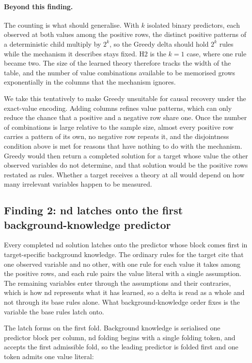 \documentclass[11pt]{article}
\DeclareRobustCommand{\code}[1]{\texttt{\detokenize{#1}}}
\newcommand{\beyond}{\paragraph{Beyond this finding.}}
\begin{document}
\beyond
The counting is what should generalise. With \(k\) isolated binary predictors,
each observed at both values among the positive rows, the distinct positive
patterns of a deterministic child multiply by \(2^k\), so the Greedy delta should
hold \(2^k\) rules while the mechanism it describes stays fixed. H2 is the
\(k=1\) case, where one rule became two. The size of the learned theory therefore
tracks the width of the table, and the number of value combinations available to
be memorised grows exponentially in the columns that the mechanism ignores.

We take this tentatively to make Greedy unsuitable for causal recovery under the
exact-value encoding. Adding columns refines value patterns, which can only reduce
the chance that a positive and a negative row share one. Once the number of
combinations is large relative to the sample size, almost every positive row
carries a pattern of its own, no negative row repeats it, and the disjointness
condition above is met for reasons that have nothing to do with the mechanism.
Greedy would then return a completed solution for a target whose value the other
observed variables do not determine, and that solution would be the positive rows
restated as rules. Whether a target receives a theory at all would depend on how
many irrelevant variables happen to be measured.

\subsection{Finding 2: nd latches onto the first background-knowledge predictor}

Every completed nd solution latches onto the predictor whose block comes first in
target-specific background knowledge. The ordinary rules for the target cite that
one observed variable and no other, with one rule for each value it takes among
the positive rows, and each rule pairs the value literal with a single assumption.
The remaining variables enter through the assumptions and their contraries, which
is how nd represents what it has learned, so a delta is read as a whole and not
through its base rules alone. What background-knowledge order fixes is the
variable the base rules latch onto.

The latch forms on the first fold. Background knowledge is serialised one
predictor block per column, nd folding begins with a single folding token, and
\code{folding_selection(any)} accepts the first admissible fold, so the leading
predictor is folded first and one token admits one value literal:
\end{document}
